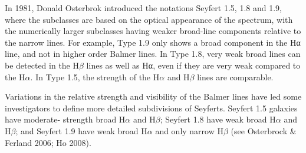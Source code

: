 \documentclass[11pt]{article}
\begin{document}
In 1981, Donald Osterbrok introduced the notations Seyfert 1.5, 1.8 and 1.9, where the subclasses are based on the optical appearance of the spectrum, with the numerically larger subclasses having weaker broad-line components relative to the narrow lines. For example, Type 1.9 only shows a broad component in the Hα line, and not in higher order Balmer lines. In Type 1.8, very weak broad lines can be detected in the H$\beta$ lines as well as Hα, even if they are very weak compared to the H$\alpha$. In Type 1.5, the strength of the H$\alpha$ and H$\beta$ lines are comparable.

\smallskip
\smallskip
\noindent
Variations in the relative strength and visibility of the Balmer lines have led some investigators to define more detailed subdivisions of Seyferts. Seyfert 1.5 galaxies have moderate- strength broad H$\alpha$ and H$\beta$; Seyfert 1.8 have weak broad H$\alpha$ and H$\beta$; and Seyfert 1.9 have weak broad H$\alpha$ and only narrow H$\beta$ (see Osterbrock \& Ferland 2006; Ho 2008).
\end{document}
